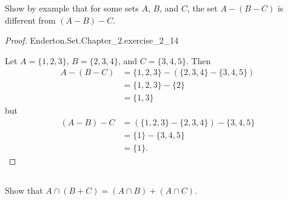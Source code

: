 \documentclass{report}
\begin{document}
Show by example that for some sets $A$, $B$, and $C$, the set $A - (B - C)$ is
  different from $(A - B) - C$.

\begin{proof}

    {Enderton.Set.Chapter\_2.exercise\_2\_14}

  Let $A = \{1, 2, 3\}$, $B = \{2, 3, 4\}$, and $C = \{3, 4, 5\}$.
  Then
    \begin{align*}
      A - (B - C)
        & = \{1, 2, 3\} - (\{2, 3, 4\} - \{3, 4, 5\}) \\
        & = \{1, 2, 3\} - \{2\} \\
        & = \{1, 3\}
    \end{align*}
    but
    \begin{align*}
      (A - B) - C
        & = (\{1, 2, 3\} - \{2, 3, 4\}) - \{3, 4, 5\} \\
        & = \{1\} - \{3, 4, 5\} \\
        & = \{1\}.
    \end{align*}

\end{proof}

\subsection{}%
\label{sub:exercise-2.15a}

Show that $A \cap (B + C) = (A \cap B) + (A \cap C)$.
\end{document}
